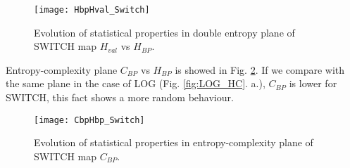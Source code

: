 \begin{figure}
	\texttt{[image: HbpHval\_Switch]}
	\caption{Evolution of statistical properties in double entropy plane of SWITCH map $H_{val}$ vs $H_{BP}$.}
	\label{fig:SWITCH_HH}
\end{figure}

Entropy-complexity plane $C_{BP}$ vs $H_{BP}$ is showed in Fig. \ref{fig:SWITCH_HC}.
If we compare with the same plane in the case of LOG (Fig. \ref{fig:LOG_HC}. a.), $C_{BP}$ is lower for SWITCH, this fact shows a more random behaviour.

\begin{figure}
	\texttt{[image: CbpHbp\_Switch]}
	\caption{Evolution of statistical properties in entropy-complexity plane of SWITCH map $C_{BP}$.}
	\label{fig:SWITCH_HC}
\end{figure}